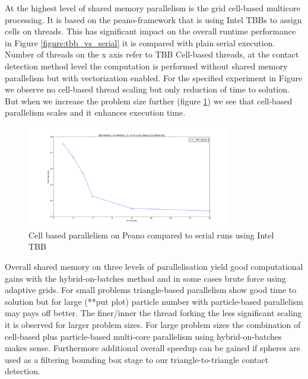 At the highest level of shared memory parallelism is the grid cell-based multicore processing. It is based on the peano-framework that is using Intel TBBs to assign cells on threads. This has significant impact on the overall runtime performance in Figure \ref{figure:tbb_vs_serial} it is compared with plain serial execution. Number of threads on the x axis refer to TBB Cell-based threads, at the contact detection method level the computation is performed without shared memory parallelism but with vectorization enabled. For the specified experiment in Figure {} we observe no cell-based thread scaling but only reduction of time to solution. But when we increase the problem size further (figure \ref{figure:tbb_scaling}) we see that cell-based parallelism scales and it enhances execution time. 

\begin{figure}[htb]
  \begin{center}
    \includegraphics[width=0.8\textwidth]{experiments/random/omp/tbb_regular_x2.png}
  \end{center}
  \caption{Cell based parallelism on Peano compared to serial runs using Intel TBB}
  \label{figure:tbb_scaling}
\end{figure}

Overall shared memory on three levels of parallelisation yield good computational gains with the hybrid-on-batches method and in some cases brute force using adaptive grids. For small problems triangle-based parallelism show good time to solution but for large (**put plot) particle number with particle-based parallelism may pays off better. The finer/inner the thread forking the less significant scaling it is observed for larger problem sizes. For large problem sizes the combination of cell-based plus particle-based multi-core parallelism using hybrid-on-batches makes sense. Furthermore additional overall speedup can be gained if spheres are used as a filtering bounding box stage to our triangle-to-triangle contact detection.

\clearpage

